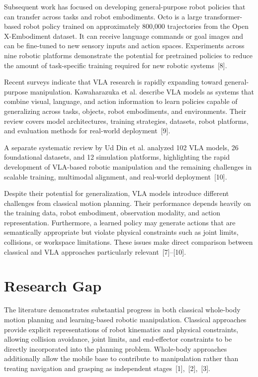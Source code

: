 \documentclass[12pt,a4paper]{article}
\begin{document}
Subsequent work has focused on developing general-purpose robot policies that can
transfer across tasks and robot embodiments. Octo is a large transformer-based robot policy
trained on approximately 800,000 trajectories from the Open X-Embodiment dataset. It can
receive language commands or goal images and can be fine-tuned to new sensory inputs and
action spaces. Experiments across nine robotic platforms demonstrate the potential for
pretrained policies to reduce the amount of task-specific training required for new robotic
systems~[8].

Recent surveys indicate that VLA research is rapidly expanding toward general-purpose
manipulation. Kawaharazuka et al. describe VLA models as systems that combine visual,
language, and action information to learn policies capable of generalizing across tasks, objects,
robot embodiments, and environments. Their review covers model architectures, training
strategies, datasets, robot platforms, and evaluation methods for real-world deployment~[9].

A separate systematic review by Ud Din et al. analyzed 102 VLA models, 26 foundational
datasets, and 12 simulation platforms, highlighting the rapid development of VLA-based robotic
manipulation and the remaining challenges in scalable training, multimodal alignment, and
real-world deployment~[10].

Despite their potential for generalization, VLA models introduce different challenges
from classical motion planning. Their performance depends heavily on the training data, robot
embodiment, observation modality, and action representation. Furthermore, a learned policy
may generate actions that are semantically appropriate but violate physical constraints such as
joint limits, collisions, or workspace limitations. These issues make direct comparison between
classical and VLA approaches particularly relevant~[7]--[10].

\newpage
\section*{Research Gap}

The literature demonstrates substantial progress in both classical whole-body motion
planning and learning-based robotic manipulation. Classical approaches provide explicit
representations of robot kinematics and physical constraints, allowing collision avoidance, joint
limits, and end-effector constraints to be directly incorporated into the planning problem.
Whole-body approaches additionally allow the mobile base to contribute to manipulation
rather than treating navigation and grasping as independent stages~[1],~[2],~[3].
\end{document}
